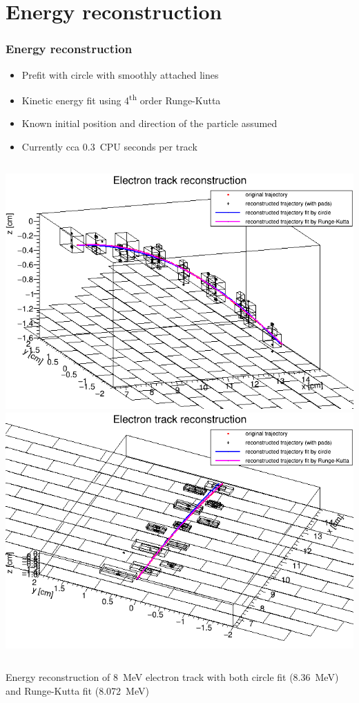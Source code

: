 \documentclass{beamer}
\begin{document}
	\section{Energy reconstruction}
	\begin{frame}
		\frametitle{Energy reconstruction}
		\begin{itemize}
			\item Prefit with circle with smoothly attached lines
			\item Kinetic energy fit using 4\textsuperscript{th} order Runge-Kutta
			\item Known initial position and direction of the particle assumed
			\item Currently cca 0.3~CPU seconds per track
		\end{itemize}
		\begin{columns}
				\centering
				\includegraphics[width=\textwidth]{../images/reco_track_pads2.png}\\
				\centering
				\includegraphics[width=\textwidth]{../images/reco_track_pads3.png}\\
		\end{columns}
		\vspace{0.5cm}
		\centering
		\begin{minipage}{0.8\textwidth}
			\centering
			\small{Energy reconstruction of 8~MeV electron track with both circle fit (8.36~MeV) and Runge-Kutta fit (8.072~MeV)}
		\end{minipage}
	\end{frame}
\end{document}

